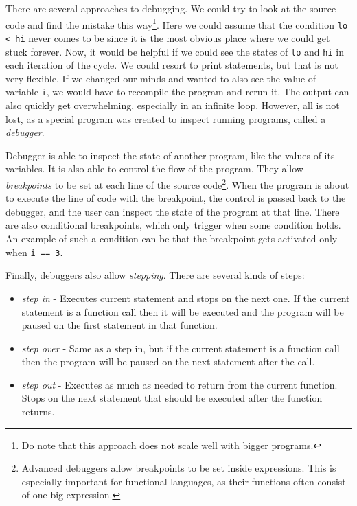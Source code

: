 There are several approaches to debugging. We could try to look at the source
code and find the mistake this way\footnote{Do note that this approach does not
scale well with bigger programs.}. Here we could assume that the condition
\texttt{lo < hi} never comes to be since it is the most obvious place where we
could get stuck forever. Now, it would be helpful if we could see the states of
\texttt{lo} and \texttt{hi} in each iteration of the cycle. We could resort to
print statements, but that is not very flexible. If we changed our minds and
wanted to also see the value of variable \texttt{i}, we would have to recompile
the program and rerun it. The output can also quickly get overwhelming,
especially in an infinite loop. However, all is not lost, as a special program
was created to inspect running programs, called a \textit{debugger}.

Debugger is able to inspect the state of another program, like the values of
its variables. It is also able to control the flow of the program. They allow
\textit{breakpoints} to be set at each line of the source
code\footnote{Advanced debuggers allow breakpoints to be set inside
expressions. This is especially important for functional languages, as their
functions often consist of one big expression.}. When the program is about to
execute the line of code with the breakpoint, the control is passed back to the
debugger, and the user can inspect the state of the program at that line. There
are also conditional breakpoints, which only trigger when some condition holds.
An example of such a condition can be that the breakpoint gets activated only
when \texttt{i == 3}.

Finally, debuggers also allow \textit{stepping}. There are several kinds of
steps:
\begin{itemize}
    \item \textit{step in} - Executes current statement and stops on the next
        one. If the current statement is a function call then it will be
        executed and the program will be paused on the first statement in that
        function.
    \item \textit{step over} - Same as a step in, but if the current statement
        is a function call then the program will be paused on the next
        statement after the call.
    \item \textit{step out} -  Executes as much as needed to return from the
        current function. Stops on the next statement that should be executed
        after the function returns.
\end{itemize}

